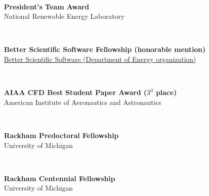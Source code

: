 \documentclass[11pt,letterpaper]{article}
\begin{document}
\begin{minipage}[t]{0.15\textwidth}%
\end{minipage}\\[2ex]%
\begin{minipage}[t]{0.82\textwidth}%
  \textbf{President’s Team Award}\\%
  National Renewable Energy Laboratory%
\end{minipage}\hfill%
\begin{minipage}[t]{0.15\textwidth}%
\end{minipage}\\[2ex]%
\begin{minipage}[t]{0.82\textwidth}%
  \textbf{Better Scientific Software Fellowship (honorable mention)}\\%
  \href{https://bssw.io/blog_posts/introducing-the-2018-bssw-fellows}{Better Scientific Software (Department of Energy organization)}%
\end{minipage}\hfill%
\begin{minipage}[t]{0.15\textwidth}%
\end{minipage}\\[2ex]%
\begin{minipage}[t]{0.82\textwidth}%
  \textbf{AIAA CFD Best Student Paper Award ($3^{\text{d}}$ place)}\\%
  American Institute of Aeronautics and Astronautics%
\end{minipage}\hfill%
\begin{minipage}[t]{0.15\textwidth}%
\end{minipage}\\[2ex]%
\begin{minipage}[t]{0.82\textwidth}%
  \textbf{Rackham Predoctoral Fellowship}\\%
  University of Michigan%
\end{minipage}\hfill%
\begin{minipage}[t]{0.15\textwidth}%
\end{minipage}\\[2ex]%
\begin{minipage}[t]{0.82\textwidth}%
  \textbf{Rackham Centennial Fellowship}\\%
  University of Michigan%
\end{minipage}\hfill%
\begin{minipage}[t]{0.15\textwidth}%
\end{minipage}\\[2ex]%
\end{document}

